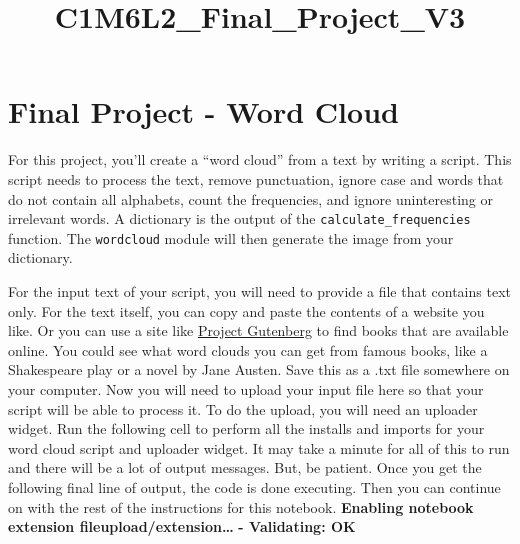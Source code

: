 \documentclass[11pt]{article}
\title{C1M6L2\_Final\_Project\_V3}
\begin{document}
    
    
    \maketitle
    
    

    
    \hypertarget{final-project---word-cloud}{%
\section{Final Project - Word Cloud}\label{final-project---word-cloud}}

    For this project, you'll create a ``word cloud'' from a text by writing
a script. This script needs to process the text, remove punctuation,
ignore case and words that do not contain all alphabets, count the
frequencies, and ignore uninteresting or irrelevant words. A dictionary
is the output of the \texttt{calculate\_frequencies} function. The
\texttt{wordcloud} module will then generate the image from your
dictionary.

    For the input text of your script, you will need to provide a file that
contains text only. For the text itself, you can copy and paste the
contents of a website you like. Or you can use a site like
\href{https://www.gutenberg.org/}{Project Gutenberg} to find books that
are available online. You could see what word clouds you can get from
famous books, like a Shakespeare play or a novel by Jane Austen. Save
this as a .txt file somewhere on your computer. Now you will need to
upload your input file here so that your script will be able to process
it. To do the upload, you will need an uploader widget. Run the
following cell to perform all the installs and imports for your word
cloud script and uploader widget. It may take a minute for all of this
to run and there will be a lot of output messages. But, be patient. Once
you get the following final line of output, the code is done executing.
Then you can continue on with the rest of the instructions for this
notebook. \textbf{Enabling notebook extension
fileupload/extension\ldots{}} \textbf{- Validating: OK}
\end{document}
